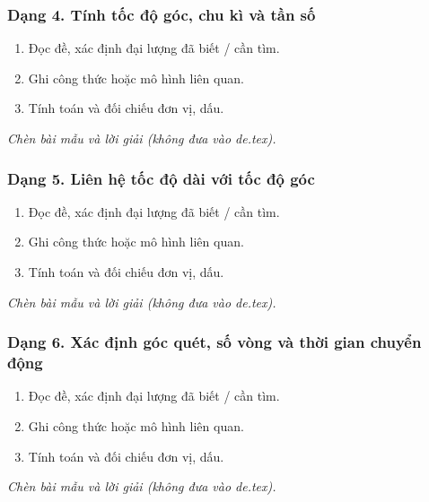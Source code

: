 \subsubsection{Dạng 4. Tính tốc độ góc, chu kì và tần số}
\begin{phuongphap}
\begin{enumerate}
\item Đọc đề, xác định đại lượng đã biết / cần tìm.
\item Ghi công thức hoặc mô hình liên quan.
\item Tính toán và đối chiếu đơn vị, dấu.
\end{enumerate}
\end{phuongphap}
\begin{vidumau}
\textit{Chèn bài mẫu và lời giải (không đưa vào de.tex).}
\end{vidumau}

\subsubsection{Dạng 5. Liên hệ tốc độ dài với tốc độ góc}
\begin{phuongphap}
\begin{enumerate}
\item Đọc đề, xác định đại lượng đã biết / cần tìm.
\item Ghi công thức hoặc mô hình liên quan.
\item Tính toán và đối chiếu đơn vị, dấu.
\end{enumerate}
\end{phuongphap}
\begin{vidumau}
\textit{Chèn bài mẫu và lời giải (không đưa vào de.tex).}
\end{vidumau}

\subsubsection{Dạng 6. Xác định góc quét, số vòng và thời gian chuyển động}
\begin{phuongphap}
\begin{enumerate}
\item Đọc đề, xác định đại lượng đã biết / cần tìm.
\item Ghi công thức hoặc mô hình liên quan.
\item Tính toán và đối chiếu đơn vị, dấu.
\end{enumerate}
\end{phuongphap}
\begin{vidumau}
\textit{Chèn bài mẫu và lời giải (không đưa vào de.tex).}
\end{vidumau}

